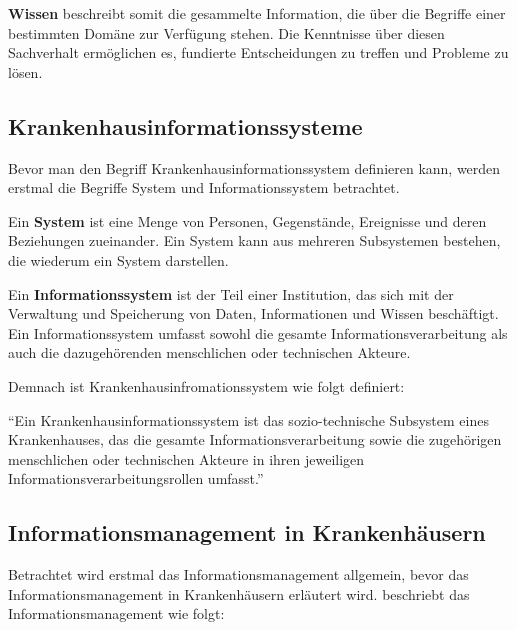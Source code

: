 \textbf{Wissen} beschreibt somit die gesammelte Information, die über die Begriffe einer bestimmten Domäne zur Verfügung stehen. 
Die Kenntnisse über diesen Sachverhalt ermöglichen es, fundierte Entscheidungen zu treffen und Probleme zu lösen.

\subsection{Krankenhausinformationssysteme}

Bevor man den Begriff Krankenhausinformationssystem definieren kann, werden erstmal die Begriffe System und Informationssystem betrachtet. \newline

Ein \textbf{System} ist eine Menge von Personen, Gegenstände, Ereignisse und deren Beziehungen zueinander. 
Ein System kann aus mehreren Subsystemen bestehen, die wiederum ein System darstellen. \citep[vgl.]{winter_health_2011} \newline

Ein \textbf{Informationssystem} ist der Teil einer Institution, das sich mit der Verwaltung und Speicherung von Daten, Informationen und Wissen beschäftigt.
Ein Informationssystem umfasst sowohl die gesamte Informationsverarbeitung als auch die dazugehörenden menschlichen oder technischen Akteure. \citep[vgl.]{winter_health_2011} \newline

Demnach ist Krankenhausinfromationssystem wie folgt definiert: 

\begin{definition}
	\enquote{Ein Krankenhausinformationssystem ist das sozio-technische Subsystem eines Krankenhauses, das die gesamte Informationsverarbeitung sowie die zugehörigen menschlichen oder technischen Akteure in ihren jeweiligen Informationsverarbeitungsrollen umfasst.} \citep{winter_health_2011}
\end{definition}

\subsection{Informationsmanagement in Krankenhäusern}

Betrachtet wird erstmal das Informationsmanagement allgemein, bevor das Informationsmanagement in Krankenhäusern erläutert wird.
\citet{gehring2022informationsmanagement} beschriebt das Informationsmanagement wie folgt: \\

